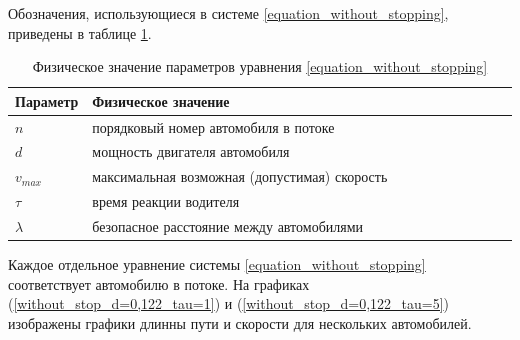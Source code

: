 \documentclass[12pt, a4paper]{extarticle}
\numberwithin{equation}{section}
\begin{document}
Обозначения, использующиеся в системе \eqref{equation_without_stopping}, приведены в таблице \ref{parameters}.

\begin{table}[h!]
	\caption{Физическое значение параметров уравнения \eqref{equation_without_stopping}}
	\label{parameters}
	\begin{center}
		\begin{tabularx}{\textwidth}{p{0.15\linewidth}p{0.85\linewidth}}			
			\hline
			\rule{0cm}{0,5cm}
			Параметр &  Физическое значение \\ 
			[3pt]\hline
			$n$ & порядковый номер автомобиля в потоке\\
			$d$ & мощность двигателя автомобиля \\
			$v_{max}$ & максимальная возможная (допустимая) скорость \\
			$\tau$ & время реакции водителя \\
			$\lambda $ & безопасное расстояние между автомобилями \\ 
			\hline
		\end{tabularx}
	\end{center}
\end{table}

Каждое отдельное уравнение системы \eqref{equation_without_stopping} соответствует автомобилю в потоке. На графиках (\ref{without_stop_d=0,122_tau=1}) и (\ref{without_stop_d=0,122_tau=5}) изображены графики длинны пути и скорости для нескольких автомобилей.
\end{document}
